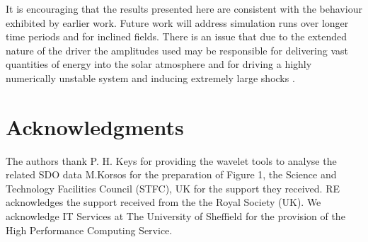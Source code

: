 \documentclass[twocolumn]{aastex62}
\begin{document}
It is encouraging that the results presented here are consistent with the behaviour exhibited  by earlier work. Future work will address simulation runs over longer time periods and for inclined fields. There is an issue that due to the extended nature of the driver the amplitudes used may be responsible for delivering vast quantities of energy into the solar atmosphere and for driving a highly numerically unstable system and inducing extremely large shocks \citet{Santamaria2015}. 


\section{Acknowledgments}
\acknowledgments

The authors thank P. H. Keys for providing the wavelet tools to analyse the related SDO data M.Korsos for the preparation of Figure 1, the Science and Technology Facilities Council (STFC), UK for the support they received.  RE acknowledges the support received from the the Royal Society (UK). We acknowledge IT Services at The University of Sheffield for the provision of the High Performance Computing Service.


%


\end{document}
